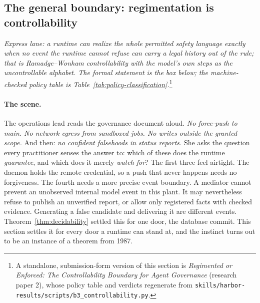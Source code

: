 \documentclass[11pt,a4paper]{article}
\theoremstyle{definition}
\theoremstyle{remark}
\begin{document}
\subsection{The general boundary: regimentation is controllability}
\label{sec:controllability}

\noindent\emph{Express lane: a runtime can realize the whole permitted safety
language exactly when no
%
event the runtime cannot refuse can carry a legal history out of the rule; that is
Ramadge--Wonham controllability with the model's own steps as the uncontrollable alphabet.
The formal statement is the box below; the machine-checked policy table is
Table~\ref{tab:policy-classification}.}\footnote{A standalone, submission-form version of this section is \emph{Regimented or Enforced: The Controllability Boundary for Agent Governance} (research paper 2), whose policy table and verdicts regenerate from \texttt{skills/harbor-results/scripts/b3\_controllability.py}.}

\paragraph{The scene.}
The operations lead reads the governance document aloud. \emph{No force-push to main. No
network egress from sandboxed jobs. No writes outside the granted scope.} And then: \emph{no
confident falsehoods in status reports.} She asks the question every practitioner senses the
answer to: which of these does the runtime \emph{guarantee}, and which does it merely
\emph{watch for}? The first three feel airtight. The daemon holds the remote credential, so a
push that never happens needs no forgiveness. The fourth needs a more precise event boundary. A mediator cannot prevent
an unobserved internal model event in this plant. It may nevertheless refuse
to publish an unverified report, or allow only registered facts with checked
evidence. Generating a false candidate and delivering it are different events. Theorem~\ref{thm:decidability} settled this for one
door, the database commit. This section settles it for every door a runtime can stand at,
and the instinct turns out to be an instance of a theorem from 1987.
\end{document}
